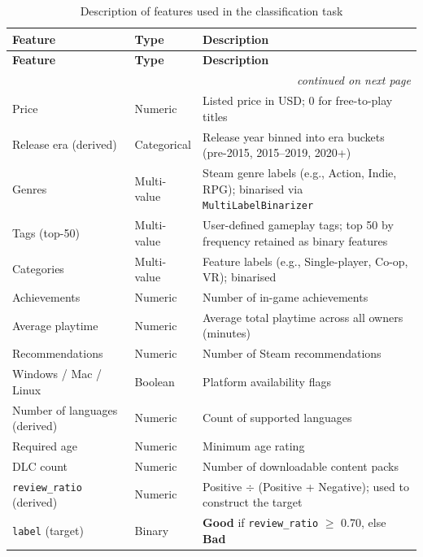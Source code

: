 \documentclass[11pt, a4paper]{article}
\begin{document}
\begin{center}
\begin{longtable}{@{} p{4.2cm} p{2.5cm} p{7.8cm} @{}}
\caption{Description of features used in the classification task}
\label{tab:features}\\
\toprule
\textbf{Feature} & \textbf{Type} & \textbf{Description} \\
\midrule
\endfirsthead
\toprule
\textbf{Feature} & \textbf{Type} & \textbf{Description} \\
\midrule
\endhead
\midrule
\multicolumn{3}{r}{\small\itshape continued on next page}\\
\endfoot
\bottomrule
\endlastfoot
Price                          & Numeric     & Listed price in USD; 0 for free-to-play titles \\
Release era (derived)          & Categorical & Release year binned into era buckets (pre-2015, 2015--2019, 2020+) \\
Genres                         & Multi-value & Steam genre labels (e.g., Action, Indie, RPG); binarised via \texttt{MultiLabelBinarizer} \\
Tags (top-50)                  & Multi-value & User-defined gameplay tags; top 50 by frequency retained as binary features \\
Categories                     & Multi-value & Feature labels (e.g., Single-player, Co-op, VR); binarised \\
Achievements                   & Numeric     & Number of in-game achievements \\
Average playtime               & Numeric     & Average total playtime across all owners (minutes) \\
Recommendations                & Numeric     & Number of Steam recommendations \\
Windows / Mac / Linux          & Boolean     & Platform availability flags \\
Number of languages (derived)  & Numeric     & Count of supported languages \\
Required age                   & Numeric     & Minimum age rating \\
DLC count                      & Numeric     & Number of downloadable content packs \\
\texttt{review\_ratio} (derived) & Numeric   & Positive $\div$ (Positive + Negative); used to construct the target \\
\texttt{label} (target)        & Binary      & \textbf{Good} if \texttt{review\_ratio} $\geq$ 0.70, else \textbf{Bad} \\
\end{longtable}
\end{center}
\end{document}
